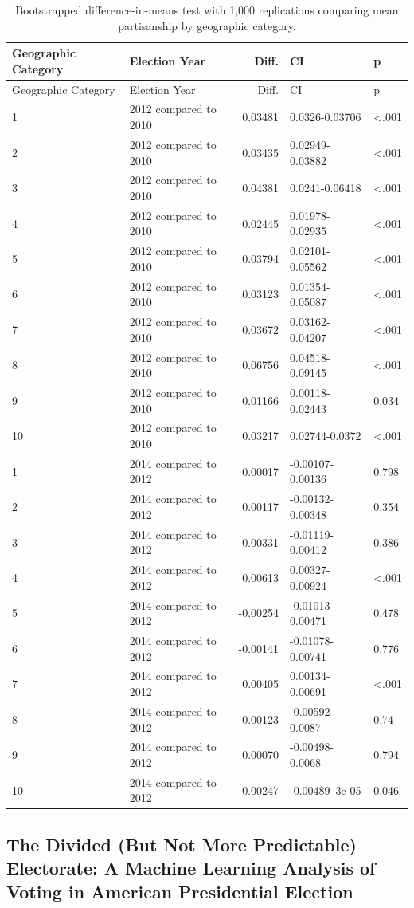\documentclass[10pt,]{article}
\begin{document}
\begin{longtable}[]{@{}llrll@{}}
\caption{Bootstrapped difference-in-means test with 1,000 replications
comparing mean partisanship by geographic category.}\tabularnewline
\toprule
Geographic Category & Election Year & Diff. & CI & p\tabularnewline
\midrule
\endfirsthead
\toprule
Geographic Category & Election Year & Diff. & CI & p\tabularnewline
\midrule
\endhead
1 & 2012 compared to 2010 & 0.03481 & 0.0326-0.03706 &
\textless.001\tabularnewline
2 & 2012 compared to 2010 & 0.03435 & 0.02949-0.03882 &
\textless.001\tabularnewline
3 & 2012 compared to 2010 & 0.04381 & 0.0241-0.06418 &
\textless.001\tabularnewline
4 & 2012 compared to 2010 & 0.02445 & 0.01978-0.02935 &
\textless.001\tabularnewline
5 & 2012 compared to 2010 & 0.03794 & 0.02101-0.05562 &
\textless.001\tabularnewline
6 & 2012 compared to 2010 & 0.03123 & 0.01354-0.05087 &
\textless.001\tabularnewline
7 & 2012 compared to 2010 & 0.03672 & 0.03162-0.04207 &
\textless.001\tabularnewline
8 & 2012 compared to 2010 & 0.06756 & 0.04518-0.09145 &
\textless.001\tabularnewline
9 & 2012 compared to 2010 & 0.01166 & 0.00118-0.02443 &
0.034\tabularnewline
10 & 2012 compared to 2010 & 0.03217 & 0.02744-0.0372 &
\textless.001\tabularnewline
1 & 2014 compared to 2012 & 0.00017 & -0.00107-0.00136 &
0.798\tabularnewline
2 & 2014 compared to 2012 & 0.00117 & -0.00132-0.00348 &
0.354\tabularnewline
3 & 2014 compared to 2012 & -0.00331 & -0.01119-0.00412 &
0.386\tabularnewline
4 & 2014 compared to 2012 & 0.00613 & 0.00327-0.00924 &
\textless.001\tabularnewline
5 & 2014 compared to 2012 & -0.00254 & -0.01013-0.00471 &
0.478\tabularnewline
6 & 2014 compared to 2012 & -0.00141 & -0.01078-0.00741 &
0.776\tabularnewline
7 & 2014 compared to 2012 & 0.00405 & 0.00134-0.00691 &
\textless.001\tabularnewline
8 & 2014 compared to 2012 & 0.00123 & -0.00592-0.0087 &
0.74\tabularnewline
9 & 2014 compared to 2012 & 0.00070 & -0.00498-0.0068 &
0.794\tabularnewline
10 & 2014 compared to 2012 & -0.00247 & -0.00489--3e-05 &
0.046\tabularnewline
\bottomrule
\end{longtable}

\hypertarget{the-divided-but-not-more-predictable-electorate-a-machine-learning-analysis-of-voting-in-american-presidential-election}{%
\subsection{The Divided (But Not More Predictable) Electorate: A Machine
Learning Analysis of Voting in American Presidential
Election}\label{the-divided-but-not-more-predictable-electorate-a-machine-learning-analysis-of-voting-in-american-presidential-election}}
\end{document}
